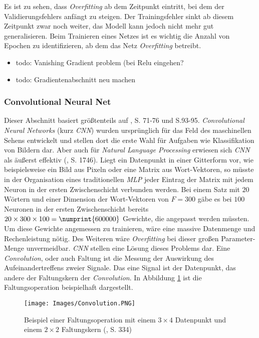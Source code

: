 \documentclass[a4paper,11pt]{article}
\begin{document}
Es ist zu sehen, dass \textit{Overfitting} ab dem Zeitpunkt eintritt, bei dem der Validierungsfehlers anfängt zu steigen. Der Trainingsfehler sinkt ab diesem Zeitpunkt zwar noch weiter, das Modell kann jedoch nicht mehr gut generalisieren. Beim Trainieren eines Netzes ist es wichtig die Anzahl von Epochen zu identifizieren, ab dem das Netz \textit{Overfitting} betreibt.

\begin{itemize}
    \item todo: Vanishing Gradient problem (bei Relu eingehen?
    \item todo: Gradientenabschnitt neu machen
\end{itemize}{}

\subsubsection{Convolutional Neural Net} \label{kap:CNN}

Dieser Abschnitt basiert größtenteils auf \cite{deepEssentials}, S. 71-76 und S.93-95.
\textit{Convolutional Neural Networks} (kurz \textit{CNN}) wurden ursprünglich für das Feld des maschinellen Sehens entwickelt und stellen dort die erste Wahl für Aufgaben wie Klassifikation von Bildern dar. Aber auch für \textit{Natural Language Processing} erwiesen sich \textit{CNN} als äußerst effektiv (\cite{cnnSentence}, S. 1746). Liegt ein Datenpunkt in einer Gitterform vor, wie beispielsweise ein Bild aus Pixeln oder eine Matrix aus Wort-Vektoren, so müsste in der Organisation eines traditionellen \textit{MLP} jeder Eintrag der Matrix mit jedem Neuron in der ersten Zwischenschicht verbunden werden. Bei einem Satz mit $20$ Wörtern und einer Dimension der Wort-Vektoren von $F = 300$ gäbe es bei $100$ Neuronen in der ersten Zwischenschicht bereits $20 \times 300 \times 100  = \numprint{600000}$ Gewichte, die angepasst werden müssten. Um diese Gewichte angemessen zu trainieren, wäre eine massive Datenmenge und Rechenleistung nötig. Des Weiteren wäre \textit{Overfitting} bei dieser großen Parameter-Menge unvermeidbar. \textit{CNN} stellen eine Lösung dieses Problems dar. Eine \textit{Convolution}, oder auch Faltung ist die Messung der Auswirkung des Aufeinandertreffens zweier Signale. Das eine Signal ist der Datenpunkt, das andere der Faltungskern der \textit{Convolution}. In Abbildung \ref{abb:Convolution} ist die Faltungsoperation beispielhaft dargestellt.


\begin{figure}[!ht]
\begin{center}
\texttt{[image: Images/Convolution.PNG]}
\caption{Beispiel einer Faltungsoperation mit einem $3 \times 4$ Datenpunkt und einem $2 \times 2$ Faltungskern (\cite{deepL}, S. 334)}
\label{abb:Convolution}
\end{center}
\end{figure}
\end{document}
